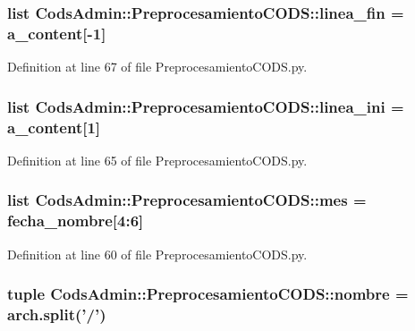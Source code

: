 \subsubsection[{linea\-\_\-fin}]{\setlength{\rightskip}{0pt plus 5cm}list {\bf \-Cods\-Admin\-::\-Preprocesamiento\-C\-O\-D\-S\-::linea\-\_\-fin} = {\bf a\-\_\-content}[-\/1]}\label{namespace_cods_admin_1_1_preprocesamiento_c_o_d_s_a2a542337422f7b641b1514af533351c3}


\-Definition at line 67 of file \-Preprocesamiento\-C\-O\-D\-S.\-py.

\subsubsection[{linea\-\_\-ini}]{\setlength{\rightskip}{0pt plus 5cm}list {\bf \-Cods\-Admin\-::\-Preprocesamiento\-C\-O\-D\-S\-::linea\-\_\-ini} = {\bf a\-\_\-content}[1]}\label{namespace_cods_admin_1_1_preprocesamiento_c_o_d_s_afda9d28a3fb0d5dacde75d749c658ece}


\-Definition at line 65 of file \-Preprocesamiento\-C\-O\-D\-S.\-py.

\subsubsection[{mes}]{\setlength{\rightskip}{0pt plus 5cm}list {\bf \-Cods\-Admin\-::\-Preprocesamiento\-C\-O\-D\-S\-::mes} = {\bf fecha\-\_\-nombre}[4\-:6]}\label{namespace_cods_admin_1_1_preprocesamiento_c_o_d_s_a9886d545ab54c8e700786ea4b0167b5d}


\-Definition at line 60 of file \-Preprocesamiento\-C\-O\-D\-S.\-py.

\subsubsection[{nombre}]{\setlength{\rightskip}{0pt plus 5cm}tuple {\bf \-Cods\-Admin\-::\-Preprocesamiento\-C\-O\-D\-S\-::nombre} = arch.\-split('/')}\label{namespace_cods_admin_1_1_preprocesamiento_c_o_d_s_ab24eb325e3db618f5334a57062c9ca7f}


